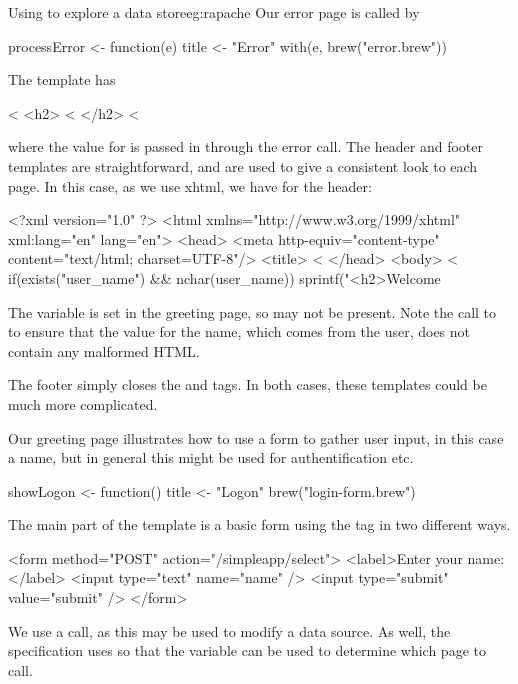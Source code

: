 \begin{example}{Using  to explore a data store}{eg:rapache}
Our error page is called by
\begin{Schunk}
\begin{Sinput}
 processError <- function(e) {
   title <- "Error"
   with(e, brew("error.brew"))
 }
\end{Sinput}
\end{Schunk}
The  template has
\begin{HTMLinput}
<%
<h2>
  <%
</h2>
<%
\end{HTMLinput}
where the value for  is passed in through the error
call. The header and footer templates are straightforward, and are
used to give a consistent look to each page. In this case, as we use
xhtml, we have for the header:
\begin{HTMLinput}
<?xml version="1.0" ?>
<html xmlns="http://www.w3.org/1999/xhtml" xml:lang="en" 
  lang="en">
<head>
<meta http-equiv="content-type" 
  content="text/html; charset=UTF-8"/>
<title> <%
</head>
<body>
<%
  if(exists("user_name") && nchar(user_name)) 
    sprintf("<h2>Welcome %
\end{HTMLinput}
The  variable is set in the greeting page, so may
not be present. Note the call to  to ensure that the
value for the name, which comes from the user, does not contain any
malformed HTML. 

The footer simply closes the  and  tags. In both
cases, these templates could be much more complicated.

Our greeting page illustrates how to use a form to gather user input, in this case a name, but in general this might be used for authentification etc.
\begin{Schunk}
\begin{Sinput}
 showLogon <- function() {
   title <- "Logon"
   brew("login-form.brew")
 }
\end{Sinput}
\end{Schunk}
The main part of the  template is a basic form using the
 tag in two different ways.
\begin{HTMLinput}
<form method="POST" action="/simpleapp/select">
<label>Enter your name:</label>
<input type="text" name="name" />
<input type="submit" value="submit" />
</form>
\end{HTMLinput}
We use a  call, as this may be used to modify a data
source. As well, the  specification uses  so
that the  variable can be used to determine which
page to call.



\end{example}
